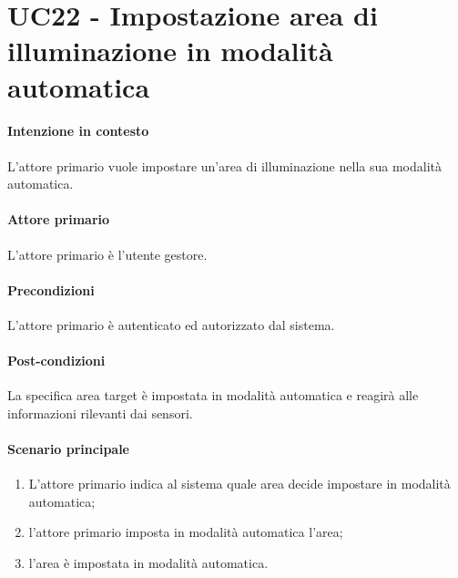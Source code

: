 \section{UC22 - Impostazione area di illuminazione in modalità automatica}\label{uc:22}
\paragraph{Intenzione in contesto} L'attore primario vuole impostare un'area di illuminazione nella sua modalità automatica.
\paragraph{Attore primario} L'attore primario è l'utente gestore.
\paragraph{Precondizioni} L'attore primario è autenticato ed autorizzato dal sistema.
\paragraph{Post-condizioni} La specifica area target è impostata in modalità automatica e reagirà alle informazioni rilevanti dai sensori.
\paragraph{Scenario principale}
\begin{enumerate}
    \item L'attore primario indica al sistema quale area decide impostare in modalità automatica;
    \item l'attore primario imposta in modalità automatica l'area;
    \item l'area è impostata in modalità automatica.
\end{enumerate}